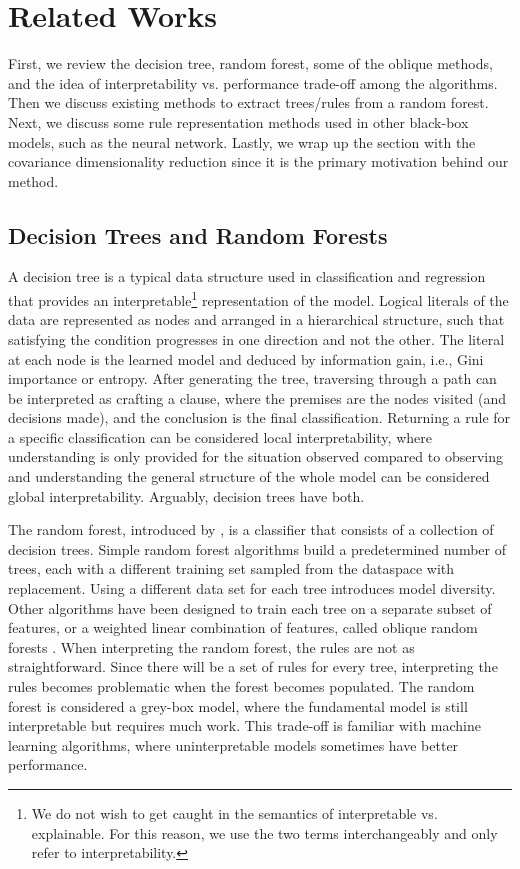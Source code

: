 \documentclass[11pt]{article}
\begin{document}
\section{Related Works}
\label{sec:related works}
First, we review the decision tree, random forest, some of the oblique methods, and the idea of interpretability vs. performance trade-off among the algorithms. Then we discuss existing methods to extract trees/rules from a random forest. Next, we discuss some rule representation methods used in other black-box models, such as the neural network. Lastly, we wrap up the section with the covariance dimensionality reduction since it is the primary motivation behind our method.
\subsection{Decision Trees and Random Forests}
A decision tree is a typical data structure used in classification and regression that provides an interpretable\footnote{We do not wish to get caught in the semantics of interpretable vs. explainable. For this reason, we use the two terms interchangeably and only refer to interpretability.} representation of the model. Logical literals of the data are represented as nodes and arranged in a hierarchical structure, such that satisfying the condition progresses in one direction and not the other. The literal at each node is the learned model and deduced by information gain, i.e., Gini importance or entropy. After generating the tree, traversing through a path can be interpreted as crafting a clause, where the premises are the nodes visited (and decisions made), and the conclusion is the final classification. Returning a rule for a specific classification can be considered local interpretability, where understanding is only provided for the situation observed compared to observing and understanding the general structure of the whole model can be considered global interpretability. Arguably, decision trees have both. 

The random forest, introduced by \cite{breiman2001random}, is a classifier that consists of a collection of decision trees. Simple random forest algorithms build a predetermined number of trees, each with a different training set sampled from the dataspace with replacement. Using a different data set for each tree introduces model diversity. Other algorithms have been designed to train each tree on a separate subset of features, or a weighted linear combination of features, called oblique random forests \citep{breiman2001random}. When interpreting the random forest, the rules are not as straightforward. Since there will be a set of rules for every tree, interpreting the rules becomes problematic when the forest becomes populated. The random forest is considered a grey-box model, where the fundamental model is still interpretable but requires much work. This trade-off is familiar with machine learning algorithms, where uninterpretable models sometimes have better performance. 
\end{document}

